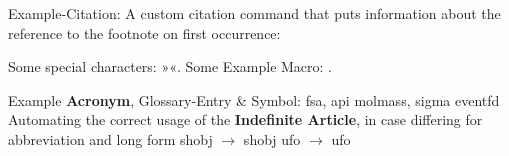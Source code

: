 %


\label{chap:chapter1}


Example-Citation:
\cite{DenKr_denkrement1_indeco}
\nl%
A custom citation command that puts information about the reference to the footnote on first occurrence:
%

\npi%
Some special characters:
»«.
\nl%
Some Example Macro:
.

\npi%
Example \textbf{Acronym}, Glossary-Entry \& Symbol:\nl
\gls{fsa}, \gls{api}\nl
\gls{molmass}, \gls{sigma}\nl
\gls{eventfd}\nl
Automating the correct usage of the \textbf{Indefinite Article}, in case differing for abbreviation and long form\nl
{} \gls{shobj} $\rightarrow$  \gls{shobj}\nl
{} \gls{ufo} $\rightarrow$  \gls{ufo}

